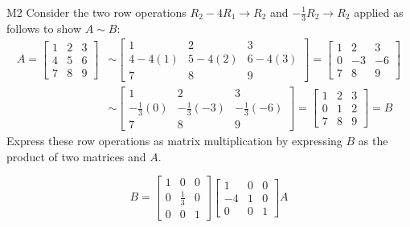 \begin{problem}{M2}
Consider the two row operations 
\(R_2-4R_1\to R_2\) and \(-\frac{1}{3}R_2\to R_2\)
applied as follows to show \(A\sim B\):
\begin{align*}
A
  =
\begin{bmatrix}
1&2&3\\
4&5&6\\
7&8&9
\end{bmatrix}
  &\sim
\begin{bmatrix}
1&2&3\\
4-4(1)&5-4(2)&6-4(3)\\
7&8&9
\end{bmatrix}
  =
\begin{bmatrix}
1&2&3\\
0&-3&-6\\
7&8&9
\end{bmatrix}
  \\&\sim
\begin{bmatrix}
1&2&3\\
-\frac{1}{3}(0)&-\frac{1}{3}(-3)&-\frac{1}{3}(-6)\\
7&8&9
\end{bmatrix}
  =
\begin{bmatrix}
1&2&3\\
0&1&2\\
7&8&9
\end{bmatrix}
  = 
B
\end{align*}
Express these row operations as matrix multiplication
by expressing \(B\) as the product of two matrices and \(A\).
\end{problem}
\begin{solution}
\[
B
  =
\begin{bmatrix}
  1&0&0\\
  0&\frac{1}{3}&0\\
  0&0&1
\end{bmatrix}
\begin{bmatrix}
  1&0&0\\
  -4&1&0\\
  0&0&1
\end{bmatrix}
A
\]
\end{solution}


